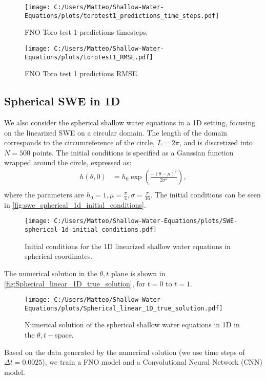 \begin{figure}[H]
    \centering
    \texttt{[image: C:/Users/Matteo/Shallow-Water-Equations/plots/torotest1\_predictions\_time\_steps.pdf]}
    \caption{FNO Toro test 1 predictions timesteps.}\label{fig:FNO_Toro_test1_predictions_time_steps}
\end{figure}


\begin{figure}[H]
    \centering
    \texttt{[image: C:/Users/Matteo/Shallow-Water-Equations/plots/torotest1\_RMSE.pdf]}
    \caption{FNO Toro test 1 predictions RMSE.}\label{fig:FNO_Toro_test1_rmse}
\end{figure}

\newpage
\subsection{Spherical SWE in 1D}
We also consider the spherical shallow water equations in a 1D setting, focusing on the linearized SWE on a circular domain.
The length of the domain corresponds to the circumreference of the circle, $L = 2\pi$, and is discretized into $N = 500$ points.
The initial conditions is specified as a Gaussian function wrapped around the circle, expressed as:
\begin{align*}
    h(\theta, 0) &= h_0 \exp \left( \frac{-{(\theta-\mu)}^2}{2 \sigma^2} \right) ,\\
\end{align*}
where the parameters are $h_0 = 1, \mu = \frac{\pi}{4}, \sigma = \frac{\pi}{16}$.
The initial conditions can be seen in \autoref{fig:swe_spherical_1d_initial_conditions}.
\begin{figure}[H]
    \centering
    \texttt{[image: C:/Users/Matteo/Shallow-Water-Equations/plots/SWE-spherical-1d-initial\_conditions.pdf]}
    \caption{Initial conditions for the 1D linearized shallow water equations in spherical coordinates.}\label{fig:swe_spherical_1d_initial_conditions}
\end{figure}
The numerical solution in the $\theta,t$ plane is shown in \autoref{fig:Spherical_linear_1D_true_solution}, for $t=0$ to $t=1$.
\begin{figure}[H]
    \centering
    \texttt{[image: C:/Users/Matteo/Shallow-Water-Equations/plots/Spherical\_linear\_1D\_true\_solution.pdf]}
    \caption{Numerical solution of the spherical shallow water equations in 1D in the $\theta,t-$space.}\label{fig:Spherical_linear_1D_true_solution}
\end{figure}
Based on the data generated by the numerical solution (we use time steps of $\Delta t = 0.0025$), we train a FNO model and a Convolutional Neural Network (CNN) model.

